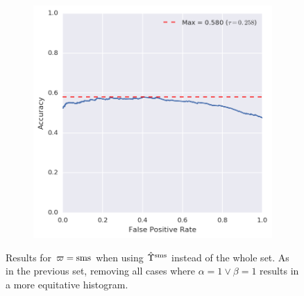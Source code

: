 \begin{figure}[!h]
\begin{subfigure}[b]{.49\textwidth}
	\includegraphics[height=.175\textheight]{figures/bayes/least1/accuracy_sms.png}
\end{subfigure}
\caption{Results for $\varpi = \operatorname{sms}$ when using $\hat{\Upsilon}^{\operatorname{sms}}$ instead of the whole set. As in the previous set, removing all cases where $\alpha = 1 \lor \beta = 1$ results in a more equitative histogram.}
\end{figure}

